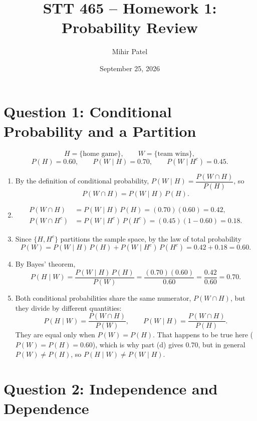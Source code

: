 \documentclass[11pt]{article}
\title{STT 465 -- Homework 1: Probability Review}
\author{Mihir Patel}
\date{September 25, 2026}
\begin{document}
\maketitle

\section*{Question 1: Conditional Probability and a Partition}

\[
H = \{\text{home game}\}, \qquad W = \{\text{team wins}\},
\]
\[
P(H) = 0.60, \qquad P(W \mid H) = 0.70, \qquad P(W \mid H^c) = 0.45.
\]

\begin{enumerate}
\item By the definition of conditional probability, $P(W \mid H) = \dfrac{P(W \cap H)}{P(H)}$, so
\[
P(W \cap H) = P(W \mid H)\,P(H).
\]

\item
\[
\begin{aligned}
P(W \cap H)   &= P(W \mid H)\,P(H) = (0.70)(0.60) = 0.42, \\
P(W \cap H^c) &= P(W \mid H^c)\,P(H^c) = (0.45)(1 - 0.60) = 0.18.
\end{aligned}
\]

\item Since $\{H, H^c\}$ partitions the sample space, by the law of total probability
\[
P(W) = P(W \mid H)\,P(H) + P(W \mid H^c)\,P(H^c) = 0.42 + 0.18 = 0.60.
\]

\item By Bayes' theorem,
\[
P(H \mid W) = \frac{P(W \mid H)\,P(H)}{P(W)} = \frac{(0.70)(0.60)}{0.60} = \frac{0.42}{0.60} = 0.70.
\]

\item Both conditional probabilities share the same numerator, $P(W \cap H)$, but they divide by different quantities:
\[
P(H \mid W) = \frac{P(W \cap H)}{P(W)}, \qquad P(W \mid H) = \frac{P(W \cap H)}{P(H)}.
\]
They are equal only when $P(W) = P(H)$. That happens to be true here ($P(W) = P(H) = 0.60$), which is why part (d) gives $0.70$, but in general $P(W) \neq P(H)$, so $P(H \mid W) \neq P(W \mid H)$.
\end{enumerate}

\section*{Question 2: Independence and Dependence}
\end{document}
